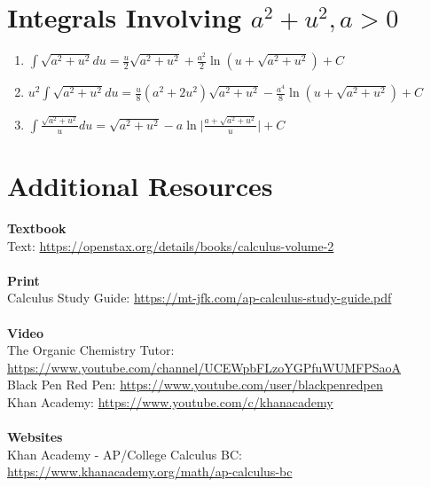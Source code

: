 \documentclass[12pt, letterpaper]{article}
\begin{document}
\section{Integrals Involving $a^2+u^2, a>0$}
\begin{enumerate}
  \item $\int \limits \sqrt{a^2 + u^2} du = \frac{u}{2} \sqrt{a^2 + u^2} + \frac{a^2}{2} \ln (u + \sqrt{a^2 + u^2}) +C$
  \item $u^2 \int \limits \sqrt{a^2 + u^2} du = \frac{u}{8} (a^2 + 2u^2) \sqrt{a^2 + u^2} - \frac{a^4}{8} \ln (u + \sqrt{a^2 + u^2}) + C$
  \item $\int \limits \frac{\sqrt{a^2+u^2}}{u} du = \sqrt{a^2 + u^2} - a\ln \Big| \frac{a+\sqrt{a^2 + u^2}}{u} \Big| +C$
\end{enumerate}

\pagebreak

\section{Additional Resources}
\textbf{Textbook}\\
Text: \url{https://openstax.org/details/books/calculus-volume-2}\\
\\
\textbf{Print}\\
Calculus Study Guide: \url{https://mt-jfk.com/ap-calculus-study-guide.pdf}\\
\\
\textbf{Video}\\
The Organic Chemistry Tutor: \url{https://www.youtube.com/channel/UCEWpbFLzoYGPfuWUMFPSaoA}\\
Black Pen Red Pen: \url{https://www.youtube.com/user/blackpenredpen}\\
Khan Academy: \url{https://www.youtube.com/c/khanacademy}\\
\\
\textbf{Websites}\\
Khan Academy - AP/College Calculus BC: \url{https://www.khanacademy.org/math/ap-calculus-bc}
\end{document}
